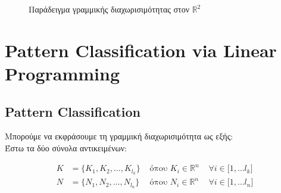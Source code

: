 \documentclass[12pt]{article}
\newcommand{\R}{\mathbb{R}}
\newcommand{\margin}{\hspace{4pt}}
\begin{document}
\begin{figure}[hp]
    \centering
    \qquad
    \caption{Παράδειγμα γραμμικής διαχωρισιμότητας στον \( \R^2 \)}
\end{figure}

\pagebreak

\section{Pattern Classification via Linear Programming}

\subsection{Pattern Classification}

Mπορούμε να εκφράσουμε τη γραμμική διαχωρισιμότητα ως εξής: \\

Έστω τα δύο σύνολα αντικειμένων: 

\begin{align*}
K & = \{K_{1}, K_{2}, \dotsc , K_{l_k}\} & \text{ όπου }  K_i \in \R^{n} & \margin \forall i \in \lbrack 1, \dotsc l_k \rbrack \\
N & = \{N_{1}, N_{2}, \dotsc , N_{l_n}\} & \text{ όπου }  N_i \in \R^{n} & \margin \forall i \in \lbrack 1, \dotsc l_n \rbrack
\end{align*}
\end{document}
